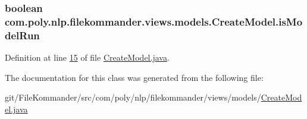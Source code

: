 \hypertarget{classcom_1_1poly_1_1nlp_1_1filekommander_1_1views_1_1models_1_1_create_model_ac8bed5b351f8c89a81528625298453a3}{
\subsubsection[{is\-Model\-Run}]{\setlength{\rightskip}{0pt plus 5cm}boolean com.\-poly.\-nlp.\-filekommander.\-views.\-models.\-Create\-Model.\-is\-Model\-Run\hspace{0.3cm}{\ttfamily [private]}}}\label{classcom_1_1poly_1_1nlp_1_1filekommander_1_1views_1_1models_1_1_create_model_ac8bed5b351f8c89a81528625298453a3}


Definition at line \hyperlink{L15}{15} of file \hyperlink{}{Create\-Model.\-java}.



The documentation for this class was generated from the following file\-:\begin{DoxyCompactItemize}
\item 
git/\-File\-Kommander/src/com/poly/nlp/filekommander/views/models/\hyperlink{_create_model_8java}{Create\-Model.\-java}\end{DoxyCompactItemize}
